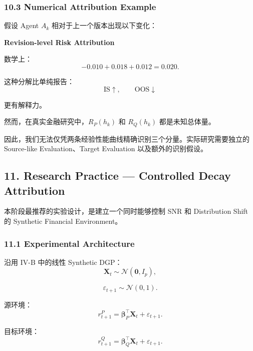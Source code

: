 \hypertarget{part-4-77-0001-numerical-attribution-example}{%
\subsubsection{10.3 Numerical Attribution Example}\label{part-4-77-0001-numerical-attribution-example}}

假设 Agent \(A_k\) 相对于上一个版本出现以下变化：

\textbf{Revision-level Risk Attribution}


数学上：
\[-0.010+0.018+0.012=0.020.\]

这种分解比单纯报告：
\[\mathrm{IS}\uparrow,\qquad\mathrm{OOS}\downarrow\]

更有解释力。

然而，在真实金融研究中，\(R_P(h_k)\) 和 \(R_Q(h_k)\) 都是未知总体量。

因此，我们无法仅凭两条经验性能曲线精确识别三个分量。实际研究需要独立的 Source-like Evaluation、Target Evaluation 以及额外的识别假设。

\hypertarget{part-4-77-0001-research-practice-controlled-decay-attribution}{%
\subsection{11. Research Practice --- Controlled Decay Attribution}\label{part-4-77-0001-research-practice-controlled-decay-attribution}}

本阶段最推荐的实验设计，是建立一个同时能够控制 SNR 和 Distribution Shift 的 Synthetic Financial Environment。

\hypertarget{part-4-77-0001-experimental-architecture}{%
\subsubsection{11.1 Experimental Architecture}\label{part-4-77-0001-experimental-architecture}}

沿用 IV-B 中的线性 Synthetic DGP：
\[\boldsymbol X_t\sim
\mathcal N(\boldsymbol0,I_p),\]

\[\varepsilon_{t+1}\sim\mathcal N(0,1).\]

源环境：
\[r_{t+1}^{P}
=
\boldsymbol\beta_P^\top\boldsymbol X_t
+\varepsilon_{t+1}.\]

目标环境：
\[r_{t+1}^{Q}
=
\boldsymbol\beta_Q^\top\boldsymbol X_t
+\varepsilon_{t+1}.\]

